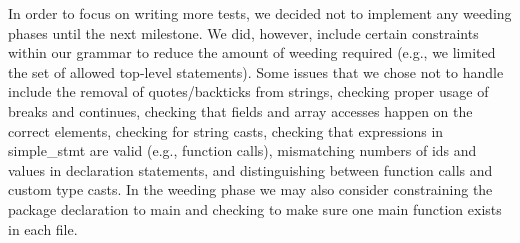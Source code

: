 \documentclass{article}
\begin{document}
In order to focus on writing more tests, we decided not to implement any weeding phases until the next milestone. We did, however, include certain constraints within our grammar to reduce the amount of weeding required (e.g., we limited the set of allowed top-level statements). Some issues that we chose not to handle include the removal of quotes/backticks from strings, checking proper usage of breaks and continues, checking that fields and array accesses happen on the correct elements, checking for string casts, checking that expressions in simple_stmt are valid (e.g., function calls), mismatching numbers of ids and values in declaration statements, and distinguishing between function calls and custom type casts. In the weeding phase we may also consider constraining the package declaration to main and checking to make sure one main function exists in each file.
\end{document}
